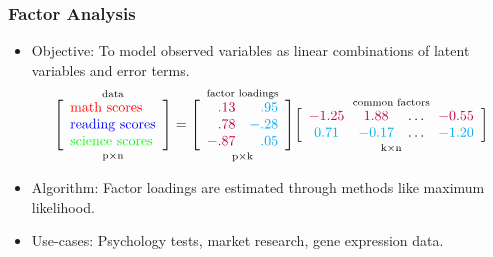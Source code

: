 \documentclass[english, threecolumn]{latex4ei/latex4ei_sheet}
\begin{document}
\begin{sectionbox}
\subsubsection{Factor Analysis}
\begin{itemize}
    \item Objective: To model observed variables as linear combinations of latent variables and error terms.
    \begin{equation*}
    \begin{array}{c}
    \underset{\mathrm{p \times n}}{
        \overset{\text{data}}{
            \left[
            \begin{array}{l}
            \textcolor{red}{\text{math scores}} \\
            \textcolor{blue}{\text{reading scores}} \\
            \textcolor{green}{\text{science scores}}
            \end{array}
            \right]
        }
    }
    =
    \underset{\mathrm{p \times k}}{
        \overset{\text{factor loadings}}{
            \left[
            \begin{array}{rr}
            \textcolor{purple}{.13} & \textcolor{cyan}{.95} \\
            \textcolor{purple}{.78} & \textcolor{cyan}{-.28} \\
            \textcolor{purple}{-.87} & \textcolor{cyan}{.05}
            \end{array}
            \right]
        }
    }
    \underset{\mathrm{k \times n}}{
        \overset{\text{common factors}}{
            \left[
            \begin{array}{cccc}
            \textcolor{purple}{-1.25} & \textcolor{purple}{1.88} & \ldots & \textcolor{purple}{-0.55} \\
            \textcolor{cyan}{0.71} & \textcolor{cyan}{-0.17} & \ldots & \textcolor{cyan}{-1.20}
            \end{array}
            \right]
        }
    } \\
    \end{array}
    \end{equation*}

    \item Algorithm: Factor loadings are estimated through methods like maximum likelihood.
    \item Use-cases: Psychology tests, market research, gene expression data.
\end{itemize}


\end{sectionbox}
\end{document}
